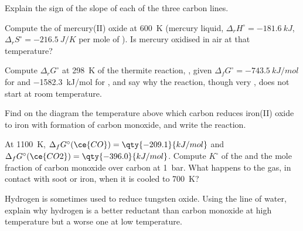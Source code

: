 \begin{exercise}[$\star$]\label{exo:b2:ellingham:4}
Explain the sign of the slope of each of the three carbon lines.
\end{exercise}

\begin{exercise}[$\star\star$]\label{exo:b2:ellingham:5}
Compute the  of mercury(II) oxide at \qty{600}{K}
(mercury liquid, $\Delta_r H^\circ = \qty{-181.6}{kJ}$, $\Delta_r S^\circ =
\qty{-216.5}{J/K}$ per mole of ). Is mercury oxidised in air at that
temperature?
\end{exercise}

\begin{exercise}[$\star\star$]\label{exo:b2:ellingham:6}
Compute $\Delta_r G^\circ$ at \qty{298}{K} of the thermite reaction, , given $\Delta_f G^\circ = \qty{-743.5}{kJ/mol}$ for
 and \qty{-1582.3}{kJ/mol} for , and say why the reaction,
though very , does not start at room temperature.
\end{exercise}

\begin{exercise}[$\star\star$]\label{exo:b2:ellingham:7}
Find on the diagram the temperature above which carbon reduces iron(II) oxide
to iron with formation of carbon monoxide, and write the reaction.
\end{exercise}

\begin{exercise}[$\star\star$]\label{exo:b2:ellingham:8}
At \qty{1100}{K}, $\Delta_f G^\circ(\ce{CO}) = \qty{-209.1}{kJ/mol}$ and
$\Delta_f G^\circ(\ce{CO2}) = \qty{-396.0}{kJ/mol}$. Compute $K^\circ$ of the
 and the mole fraction of carbon monoxide over carbon at
\qty{1}{bar}. What happens to the gas, in contact with soot or iron, when it is
cooled to \qty{700}{K}?
\end{exercise}

\begin{exercise}[$\star\star$]\label{exo:b2:ellingham:9}
Hydrogen is sometimes used to reduce tungsten oxide. Using the line of water,
explain why hydrogen is a better reductant than carbon monoxide at high
temperature but a worse one at low temperature.
\end{exercise}

